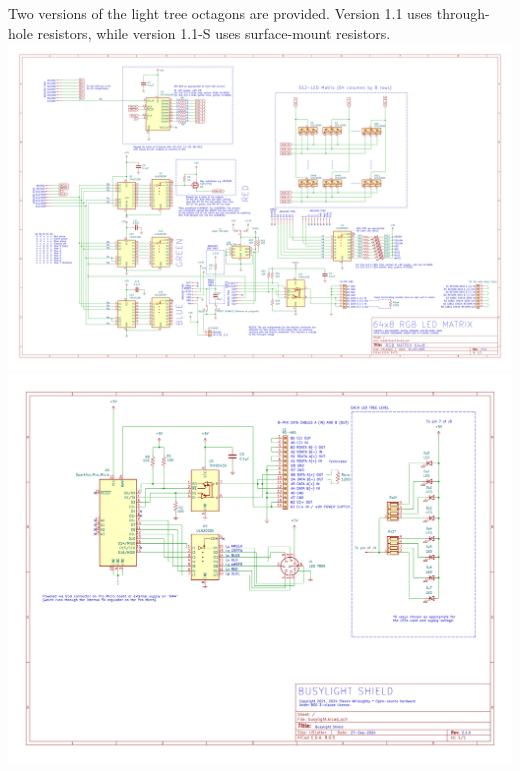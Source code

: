 Two versions of the light tree octagons are provided. Version 1.1 uses through-hole resistors, while
version 1.1-S uses surface-mount resistors.
\newpage
\noindent\includegraphics[width=\textheight,angle=90]{images/readerboard_schematic.png}
\noindent\includegraphics[width=\textheight,angle=90]{images/busylight_schematic.png}
